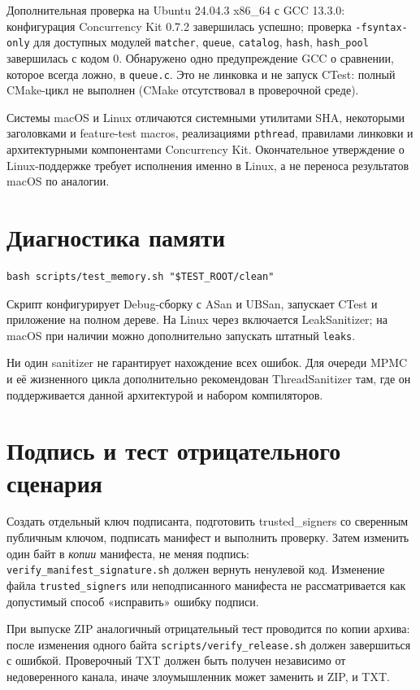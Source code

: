 \documentclass[12pt,a4paper]{article}
\begin{document}
Дополнительная проверка на Ubuntu 24.04.3 x86\_64 с GCC 13.3.0:
конфигурация Concurrency Kit 0.7.2 завершилась успешно; проверка
\texttt{-fsyntax-only} для доступных модулей \texttt{matcher},
\texttt{queue}, \texttt{catalog}, \texttt{hash}, \texttt{hash\_pool}
завершилась с кодом 0. Обнаружено одно предупреждение GCC о сравнении,
которое всегда ложно, в \texttt{queue.c}. Это не линковка и не запуск CTest:
полный CMake-цикл не выполнен (CMake отсутствовал в проверочной среде).

Системы macOS и Linux отличаются системными утилитами SHA, некоторыми
заголовками и feature-test macros, реализациями \texttt{pthread}, правилами
линковки и архитектурными компонентами Concurrency Kit. Окончательное
утверждение о Linux-поддержке требует исполнения именно в Linux, а не
переноса результатов macOS по аналогии.

\section{Диагностика памяти}

\begin{lstlisting}
bash scripts/test_memory.sh "$TEST_ROOT/clean"
\end{lstlisting}

Скрипт конфигурирует Debug-сборку с ASan и UBSan,
запускает CTest и приложение на полном дереве.
На Linux через  включается LeakSanitizer;
на macOS при наличии можно дополнительно запускать штатный \texttt{leaks}.

Ни один sanitizer не гарантирует нахождение всех ошибок. Для очереди MPMC
и её жизненного цикла дополнительно рекомендован ThreadSanitizer там,
где он поддерживается данной архитектурой и набором компиляторов.

\section{Подпись и тест отрицательного сценария}

Создать отдельный ключ подписанта, подготовить trusted\_signers со
сверенным публичным ключом, подписать манифест и выполнить проверку.
Затем изменить один байт в \emph{копии} манифеста, не меняя подпись:
\texttt{verify\_manifest\_signature.sh} должен вернуть ненулевой код.
Изменение файла \texttt{trusted\_signers} или неподписанного манифеста
не рассматривается как допустимый способ «исправить» ошибку подписи.

При выпуске ZIP аналогичный отрицательный тест проводится по копии архива:
после изменения одного байта \texttt{scripts/verify\_release.sh} должен
завершиться с ошибкой. Проверочный TXT должен быть получен независимо
от недоверенного канала, иначе злоумышленник может заменить и ZIP, и TXT.
\end{document}
